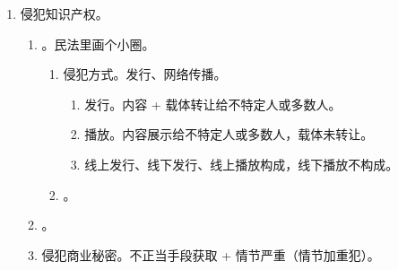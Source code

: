 \begin{enumerate}
\begin{enumerate}
\begin{enumerate}
                        但是，5 年内因逃避缴纳税款受过刑事处罚 \hz 被税务机关给予 2 次以上行政处罚的除外。
                  \item 只有纳税人能享受，单位不行。
                \end{enumerate}
          \item 骗取出口退税。想象竞合数罪并罚，独一份！！。
          \item 虚开增值税专用发票。税收安全。
                \begin{enumerate}
                  \item 目的 1 = 虚开目的、目的 2 = 逃税目的（核心）。行为 1 = 虚开行为、Opt(行为 2) = 逃税行为。
                  \item 虚开目的 +  \yjt 虚开行为。。
                  \item {}。
                  \item 抽象危险。\yi 需开就构成。\er 虚开增值税专用发票 + 骗税 = 虚开增值税专用发票。
                \end{enumerate}
          \item 虚开发票。普通发票。
        \end{enumerate}
  \item 侵犯知识产权。
        \begin{enumerate}
          \item {}。民法里画个小圈。
                \begin{enumerate}
                  \item 侵犯方式。发行、网络传播。
                        \begin{enumerate}
                          \item 发行。内容 + 载体转让给不特定人或多数人。
                          \item 播放。内容展示给不特定人或多数人，载体未转让。
                          \item 线上发行、线下发行、线上播放构成，线下播放不构成。
                        \end{enumerate}
                  \item {}。
                \end{enumerate}
          \item {}。
          \item 侵犯商业秘密。不正当手段获取 + 情节严重（情节加重犯）。

\end{enumerate}
\end{enumerate}
